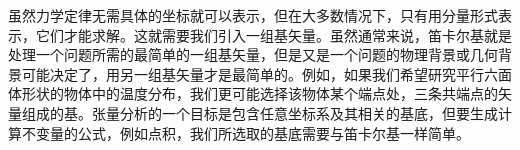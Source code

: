 虽然力学定律无需具体的坐标就可以表示，但在大多数情况下，只有用分量形式表示，它们才能求解。这就需要我们引入一组基矢量。虽然通常来说，笛卡尔基就是处理一个问题所需的最简单的一组基矢量，但是又是一个问题的物理背景或几何背景可能决定了，用另一组基矢量才是最简单的。例如，如果我们希望研究平行六面体形状的物体中的温度分布，我们更可能选择该物体某个端点处，三条共端点的矢量组成的基。张量分析的一个目标是包含任意坐标系及其相关的基底，但要生成计算不变量的公式，例如点积，我们所选取的基底需要与笛卡尔基一样简单。